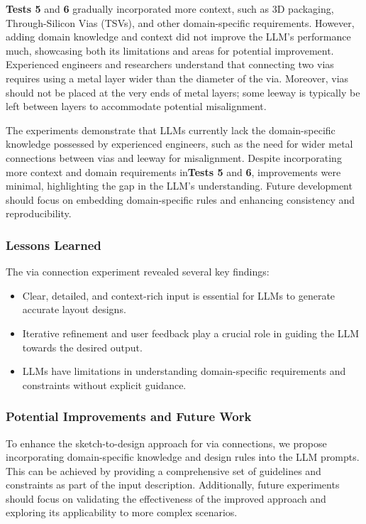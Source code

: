 \documentclass{article}
\begin{document}
\textbf{Tests 5} and \textbf{6} gradually incorporated more context, such as 3D packaging, Through-Silicon Vias (TSVs), and other domain-specific requirements. However, adding domain knowledge and context did not improve the LLM's performance much, showcasing both its limitations and areas for potential improvement. Experienced engineers and researchers understand that connecting two vias requires using a metal layer wider than the diameter of the via. Moreover, vias should not be placed at the very ends of metal layers; some leeway is typically be left between layers to accommodate potential misalignment.

The experiments demonstrate that LLMs currently lack the domain-specific knowledge possessed by experienced engineers, such as the need for wider metal connections between vias and leeway for misalignment. Despite incorporating more context and domain requirements in\textbf{Tests 5} and \textbf{6}, improvements were minimal, highlighting the gap in the LLM's understanding. Future development should focus on embedding domain-specific rules and enhancing consistency and reproducibility.



\subsubsection{Lessons Learned}
The via connection experiment revealed several key findings:
\begin{itemize}
\item Clear, detailed, and context-rich input is essential for LLMs to generate accurate layout designs.
\item Iterative refinement and user feedback play a crucial role in guiding the LLM towards the desired output.
\item LLMs have limitations in understanding domain-specific requirements and constraints without explicit guidance.
\end{itemize}
\subsubsection{Potential Improvements and Future Work}
To enhance the sketch-to-design approach for via connections, we propose incorporating domain-specific knowledge and design rules into the LLM prompts. This can be achieved by providing a comprehensive set of guidelines and constraints as part of the input description. Additionally, future experiments should focus on validating the effectiveness of the improved approach and exploring its applicability to more complex scenarios.
\end{document}
